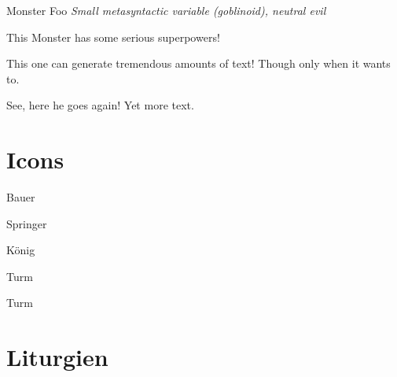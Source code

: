 \documentclass[10pt,%
  a4paper,%
  twoside,%
  openany%
  ]{book}
\begin{document}
\begin{multicols}{2}

\begin{monsterbox}{Monster Foo}
  \textit{Small metasyntactic variable (goblinoid), neutral evil}\\
  \basics[%
  armorclass = 12,
  hitpoints  = 16 (3d8 + 3),
  speed      = 50 ft
  ]
  \stats[
    STR = \stat{12}, %
    DEX = \stat{7}
  ]
  \details[%
  languages = {Common Lisp, Erlang},
  ]
  \begin{monsteraction}
    This Monster has some serious superpowers!
  \end{monsteraction}
  \begin{monsteraction}
    This one can generate tremendous amounts of text! Though only when it wants to.
  \end{monsteraction}

  \begin{monsteraction}
    See, here he goes again! Yet more text.
  \end{monsteraction}
\end{monsterbox}

\section{Icons}

\begin{dsalist}
      \item \dsabauer{} Bauer
      \item \dsaspringer{} Springer
      \item \dsakoenig{} König
      \item \dsaturm{} Turm
      \item \dsaturm{} Turm
\end{dsalist}


\section{Liturgien}


\end{multicols}
\end{document}
